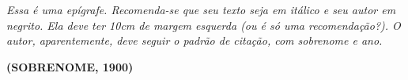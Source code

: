 \vspace*{\fill}

\begin{epigrafe}
    \textit{Essa é uma epígrafe. Recomenda-se que seu texto seja em itálico e seu autor em negrito. Ela deve ter 10cm de margem esquerda (ou é só uma recomendação?). O autor, aparentemente, deve seguir o padrão de citação, com sobrenome e ano.} 
    
    \textbf{(SOBRENOME, 1900)}
\end{epigrafe}

\OnesideTwoside{\clearpage}{\cleardoublepage}